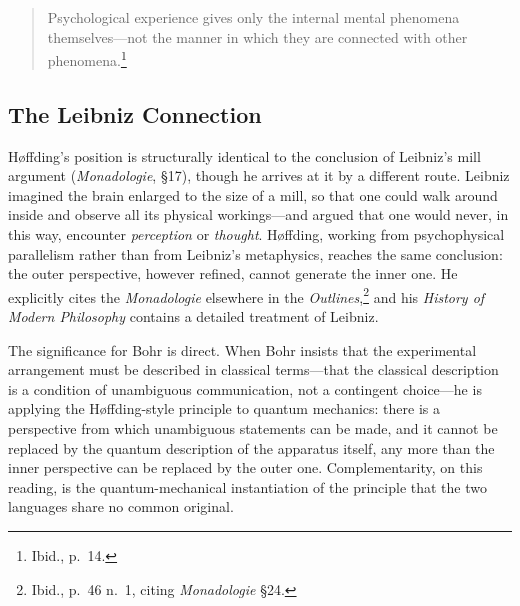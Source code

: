 \documentclass[12pt, a4paper]{article}
\begin{document}
\begin{quote}
Psychological experience gives only the internal mental phenomena
themselves---not the manner in which they are connected with other
phenomena.\footnote{Ibid., p.~14.}
\end{quote}

\subsection*{The Leibniz Connection}

H{\o}ffding's position is structurally identical to the conclusion
of Leibniz's mill argument (\emph{Monadologie}, \S{}17), though he
arrives at it by a different route. Leibniz imagined the brain
enlarged to the size of a mill, so that one could walk around inside
and observe all its physical workings---and argued that one would
never, in this way, encounter \emph{perception} or \emph{thought}.
H{\o}ffding, working from psychophysical parallelism rather than
from Leibniz's metaphysics, reaches the same conclusion: the outer
perspective, however refined, cannot generate the inner one. He
explicitly cites the \emph{Monadologie} elsewhere in the
\emph{Outlines},\footnote{Ibid., p.~46 n.\ 1, citing
\emph{Monadologie} \S{}24.} and his \emph{History of Modern
Philosophy} contains a detailed treatment of Leibniz.

The significance for Bohr is direct. When Bohr insists that the
experimental arrangement must be described in classical terms---that
the classical description is a condition of unambiguous communication,
not a contingent choice---he is applying the H{\o}ffding-style
principle to quantum mechanics: there is a perspective from which
unambiguous statements can be made, and it cannot be replaced by the
quantum description of the apparatus itself, any more than the inner
perspective can be replaced by the outer one. Complementarity, on
this reading, is the quantum-mechanical instantiation of the
principle that the two languages share no common original.
\end{document}

